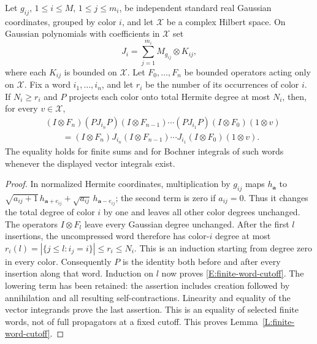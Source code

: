 \begin{lemma}\label{L:finite-word-cutoff}
Let $g_{ij}$, $1\le i\le M$, $1\le j\le m_i$, be independent
standard real Gaussian coordinates, grouped by color $i$, and let
$\mathscr X$ be a complex Hilbert space. On Gaussian polynomials
with coefficients in $\mathscr X$ set
\[
  J_i=\sum_{j=1}^{m_i}M_{g_{ij}}\otimes K_{ij},
\]
where each $K_{ij}$ is bounded on $\mathscr X$. Let
$F_0,\ldots,F_n$ be bounded operators acting only on $\mathscr X$.
Fix a word $i_1,\ldots,i_n$, and let $r_i$ be the number of its
occurrences of color $i$. If $N_i\ge r_i$ and $P$ projects each
color onto total Hermite degree at most $N_i$, then, for every
$v\in\mathscr X$,
\begin{equation}\label{E:finite-word-cutoff}
  \begin{split}
    &(I\otimes F_n)(PJ_{i_n}P)(I\otimes F_{n-1})\cdots
    (PJ_{i_1}P)(I\otimes F_0)(1\otimes v)\\
    &\qquad=(I\otimes F_n)J_{i_n}(I\otimes F_{n-1})\cdots
    J_{i_1}(I\otimes F_0)(1\otimes v).
  \end{split}
\end{equation}
The equality holds for finite sums and for Bochner integrals of such
words whenever the displayed vector integrals exist.
\end{lemma}

\begin{proof}
  In normalized Hermite coordinates, multiplication by $g_{ij}$ maps
  $h_{\boldsymbol a}$ to
  $\sqrt{a_{ij}+1}\,h_{\boldsymbol a+e_{ij}}
  +\sqrt{a_{ij}}\,h_{\boldsymbol a-e_{ij}}$; the second term is zero
  if $a_{ij}=0$. Thus it changes the total degree of color $i$ by
  one and leaves all other color degrees unchanged. The operators
  $I\otimes F_l$ leave every Gaussian degree unchanged.
  After the first $l$ insertions, the uncompressed word therefore
  has color-$i$ degree at most
  $r_i(l)=|\{j\le l:i_j=i\}|\le r_i\le N_i$.
  This is an induction starting from degree zero in every color.
  Consequently $P$ is the identity both before and after every
  insertion along that word. Induction on $l$ now proves
  \eqref{E:finite-word-cutoff}. The lowering term has been retained:
  the assertion includes creation followed by annihilation and all
  resulting self-contractions. Linearity and equality of the vector
  integrands prove the last assertion. This is an equality of selected
  finite words, not of full propagators at a fixed cutoff.
  This proves Lemma~\ref{L:finite-word-cutoff}.
\end{proof}
